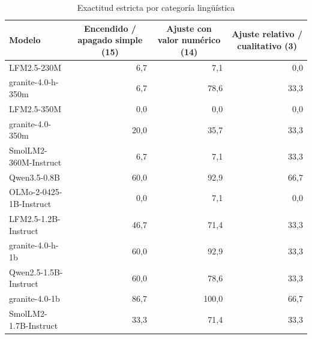 \begin{table}[htbp]
\centering
\caption{Exactitud estricta por categoría lingüística}
\label{tab:categorias}
{\footnotesize
\begin{tabular}{lrrr}
\toprule
Modelo & \multicolumn{1}{c}{\parbox[b]{2.2cm}{\centering Encendido / apagado simple (15)}} & \multicolumn{1}{c}{\parbox[b]{2.2cm}{\centering Ajuste con valor numérico (14)}} & \multicolumn{1}{c}{\parbox[b]{2.2cm}{\centering Ajuste relativo / cualitativo (3)}} \\
\midrule
LFM2.5-230M & 6,7 & 7,1 & 0,0 \\
granite-4.0-h-350m & 6,7 & 78,6 & 33,3 \\
LFM2.5-350M & 0,0 & 0,0 & 0,0 \\
granite-4.0-350m & 20,0 & 35,7 & 33,3 \\
SmolLM2-360M-Instruct & 6,7 & 7,1 & 33,3 \\
Qwen3.5-0.8B & 60,0 & 92,9 & 66,7 \\
OLMo-2-0425-1B-Instruct & 0,0 & 7,1 & 0,0 \\
LFM2.5-1.2B-Instruct & 46,7 & 71,4 & 33,3 \\
granite-4.0-h-1b & 60,0 & 92,9 & 33,3 \\
Qwen2.5-1.5B-Instruct & 60,0 & 78,6 & 33,3 \\
granite-4.0-1b & 86,7 & 100,0 & 66,7 \\
SmolLM2-1.7B-Instruct & 33,3 & 71,4 & 33,3 \\
\bottomrule
\end{tabular}
}
\end{table}
